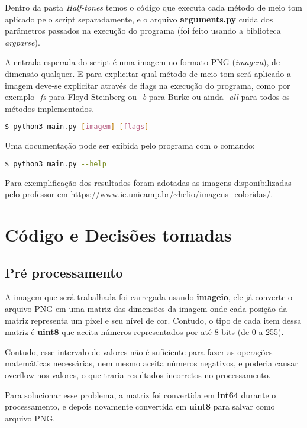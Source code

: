 \documentclass[conference]{IEEEtran}
\begin{document}
Dentro da pasta \textit{Half-tones} temos o código que executa cada método de meio tom aplicado pelo script separadamente, e o arquivo \textbf{arguments.py} cuida dos parâmetros passados na execução do programa (foi feito usando a biblioteca \textit{argparse}).

A entrada esperada do script é uma imagem no formato PNG (\textit{imagem}), de dimensão qualquer. E para explicitar qual método de meio-tom será aplicado a imagem deve-se explicitar através de flags na execução do programa, como por exemplo \textit{-fs} para Floyd Steinberg ou \textit{-b} para Burke ou ainda \textit{-all} para todos os métodos implementados.

\begin{lstlisting}[language=bash]
$ python3 main.py [imagem] [flags]
\end{lstlisting}

Uma documentação pode ser exibida pelo programa com o comando:

\begin{lstlisting}[language=bash]
$ python3 main.py --help
\end{lstlisting}

Para exemplificação dos resultados foram adotadas as imagens disponibilizadas pelo professor em \url{https://www.ic.unicamp.br/~helio/imagens_coloridas/}.

 \section{Código e Decisões tomadas}

 \subsection{Pré processamento}
 A imagem que será trabalhada foi carregada usando \textbf{imageio}, ele já converte o arquivo PNG em uma matriz das dimensões da imagem onde cada posição da matriz representa um pixel e seu nível de cor. Contudo, o tipo de cada item dessa matriz é \textbf{uint8} que aceita números representados por até 8 bits (de 0 a 255).

 Contudo, esse intervalo de valores não é suficiente para fazer as operações matemáticas necessárias, nem mesmo aceita números negativos, e poderia causar overflow nos valores, o que traria resultados incorretos no processamento.

 Para solucionar esse problema, a matriz foi convertida em \textbf{int64} durante o processamento, e depois novamente convertida em \textbf{uint8} para salvar como arquivo PNG.
\end{document}
